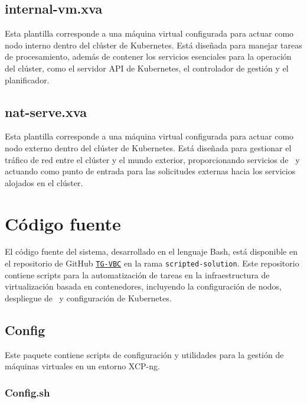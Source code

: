 \subsection{internal-vm.xva}
\noindent
Esta plantilla corresponde a una máquina virtual configurada para actuar como nodo interno dentro del clúster de Kubernetes. Está diseñada para manejar tareas de procesamiento, además de contener los servicios esenciales para la operación del clúster, como el servidor API de Kubernetes, el controlador de gestión y el planificador.

\subsection{nat-serve.xva}
\noindent
Esta plantilla corresponde a una máquina virtual configurada para actuar como nodo externo dentro del clúster de Kubernetes. Está diseñada para gestionar el tráfico de red entre el clúster y el mundo exterior, proporcionando servicios de \NAT\ y actuando como punto de entrada para las solicitudes externas hacia los servicios alojados en el clúster.

\section{Código fuente}\label{sec:automatizacion-scripts}
\noindent
El código fuente del sistema, desarrollado en el lenguaje Bash, está disponible en el repositorio de GitHub \href{https://github.com/AariazP/TG-VBC.git}{\texttt{TG-VBC}} en la rama \texttt{scripted-solution}. Este repositorio contiene scripts para la automatización de tareas en la infraestructura de virtualización basada en contenedores, incluyendo la configuración de nodos, despliegue de \VM\ y configuración de Kubernetes. 

\subsection{Config}
\noindent
Este paquete contiene scripts de configuración y utilidades para la gestión de máquinas virtuales en un entorno XCP-ng.
\subsubsection{Config.sh}
\noindent



